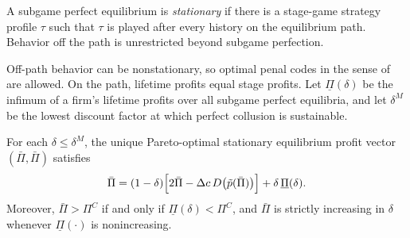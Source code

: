 \begin{definition}\label{def:13-bm-stationary}
A subgame perfect equilibrium is \emph{stationary} if there is a stage-game strategy profile $\tau$ such that
$\tau$ is played after every history on the equilibrium path. Behavior off the path is unrestricted beyond
subgame perfection.
\end{definition}

Off-path behavior can be nonstationary, so optimal penal codes in the sense of \citet{Abreu1988} are allowed.
On the path, lifetime profits equal stage profits. Let $\underline\Pi(\delta)$ be the infimum of a firm's
lifetime profits over all subgame perfect equilibria, and let $\delta^M$ be the lowest discount factor at which
perfect collusion is sustainable.

\begin{theorem}\label{thm:13-bm-optimal}
For each $\delta\le\delta^M$, the unique Pareto-optimal stationary equilibrium profit vector
$(\bar\Pi,\bar\Pi)$ satisfies
\begin{equation}\label{eq:13-bm-thm2}
\bar\Pi=(1-\delta)\Bigl[2\bar\Pi-\Delta c\,D\bigl(\tilde p(\bar\Pi)\bigr)\Bigr]+\delta\,\underline\Pi(\delta).
\end{equation}
Moreover, $\bar\Pi>\Pi^C$ if and only if $\underline\Pi(\delta)<\Pi^C$, and $\bar\Pi$ is strictly increasing in
$\delta$ whenever $\underline\Pi(\cdot)$ is nonincreasing.
\end{theorem}

